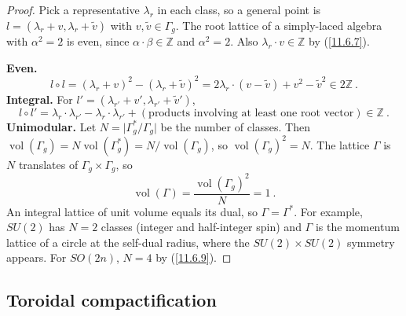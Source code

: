 \begin{tcolorbox}[breakable]
	\begin{proof}
		Pick a representative $\lambda_{r}$ in each class, so a general point is $l=(\lambda_{r}+v,\lambda_{r}+\tilde{v})$ with $v,\tilde{v}\in\Gamma_{g}$. The root lattice of a simply-laced algebra with $\alpha^{2}=2$ is even, since $\alpha\cdot\beta\in\mathds{Z}$ and $\alpha^{2}=2$. Also $\lambda_{r}\cdot v\in\mathds{Z}$ by (\ref{11.6.7}).

		\textbf{Even.}
		\begin{equation*}
			l\circ l=(\lambda_{r}+v)^{2}-(\lambda_{r}+\tilde{v})^{2}=2\lambda_{r}\cdot(v-\tilde{v})+v^{2}-\tilde{v}^{2}\in2\mathds{Z}\:.
		\end{equation*}
		\textbf{Integral.} For $l'=(\lambda_{r'}+v',\lambda_{r'}+\tilde{v}')$,
		\begin{equation*}
			l\circ l'=\lambda_{r}\cdot\lambda_{r'}-\lambda_{r}\cdot\lambda_{r'}+(\text{products involving at least one root vector})\in\mathds{Z}\:.
		\end{equation*}
		\textbf{Unimodular.} Let $N=\lvert\Gamma_{g}^{\ast}/\Gamma_{g}\rvert$ be the number of classes. Then $\operatorname{vol}(\Gamma_{g})=N\operatorname{vol}(\Gamma_{g}^{\ast})=N/\operatorname{vol}(\Gamma_{g})$, so $\operatorname{vol}(\Gamma_{g})^{2}=N$. The lattice $\Gamma$ is $N$ translates of $\Gamma_{g}\times\Gamma_{g}$, so
		\begin{equation*}
			\operatorname{vol}(\Gamma)=\frac{\operatorname{vol}(\Gamma_{g})^{2}}{N}=1\:.
		\end{equation*}
		An integral lattice of unit volume equals its dual, so $\Gamma=\Gamma^{\ast}$. For example, $SU(2)$ has $N=2$ classes (integer and half-integer spin) and $\Gamma$ is the momentum lattice of a circle at the self-dual radius, where the $SU(2)\times SU(2)$ symmetry appears. For $SO(2n)$, $N=4$ by (\ref{11.6.9}).
	\end{proof}
\end{tcolorbox}

\subsection*{Toroidal compactification}

